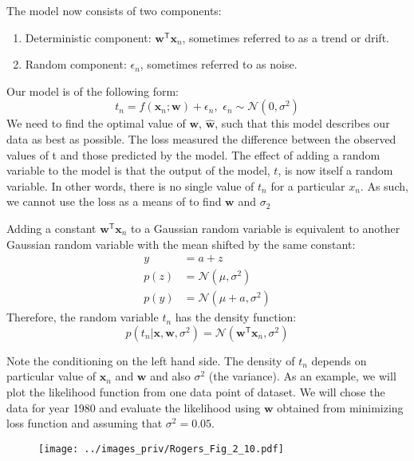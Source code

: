 The model now consists of two components:
\begin{enumerate}
\item Deterministic component: $\mathbf{w}^{\mathsf{T}}\mathbf{x}_{n}$, sometimes referred to
as a trend or drift.
\item Random component: $\epsilon_{n}$, sometimes referred to as noise.
\end{enumerate}

Our model is of the following form:
\begin{equation}
t_{n} = f(\mathbf{x}_{n}; \mathbf{w}) + \epsilon_{n}, \,\, \epsilon_{n} \sim \mathcal{N}(0,\sigma^2)
\end{equation}
We need to find the optimal value of $\mathbf{w}$, $\widehat{\mathbf{w}}$, such that this model describes
our data as best as possible.
The loss measured the difference between the observed
values of t and those predicted by the model. The effect of adding a random variable
to the model is that the output of the model, $t$, is now itself a random variable. In
other words, there is no single value of $t_n$ for a particular $x_n$.
As such, we cannot use the loss as a means of to find $\mathbf{w}$
and $\sigma_{2}$

Adding a constant $\mathbf{w}^{\mathsf{T}}\mathbf{x}_{n}$ to a
Gaussian random variable is equivalent to another Gaussian random variable
with the mean shifted by the same constant:
\begin{align*}
y & = a + z \\
p(z) & = \mathcal{N}(\mu,\sigma^2) \\
p(y) & = \mathcal{N}(\mu + a,\sigma^2)
\end{align*}
Therefore, the random variable $t_n$ has the density function:
\begin{equation}
p(t_{n}|\mathbf{x},\mathbf{w},\sigma^2) =
\mathcal{N}(\mathbf{w}^{\mathsf{T}}\mathbf{x}_{n},\sigma^2)
\end{equation}

Note the conditioning on the left hand side. The density of $t_n$ depends on particular
value  of $\mathbf{x}_{n}$ and $\mathbf{w}$ and also $\sigma^2$ (the variance).
As an example, we will plot the likelihood function from one data point of
 dataset. We will chose the data for year 1980 and evaluate
the likelihood using $\mathbf{w}$ obtained from minimizing loss function and
assuming that $\sigma^2=0.05$.

\begin{figure}[h]
\begin{center}
\texttt{[image: ../images\_priv/Rogers\_Fig\_2\_10.pdf]}
\end{center}
\end{figure}

